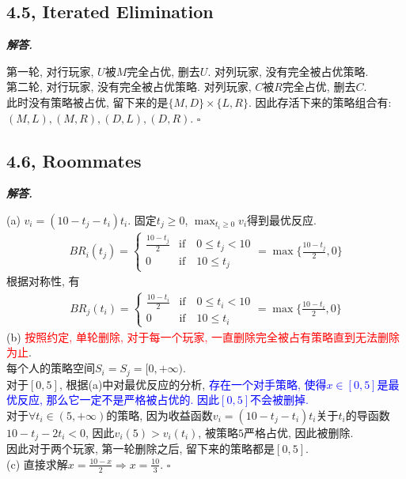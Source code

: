 \documentclass[10pt, a4paper, oneside]{ctexart}
\newenvironment{solution}{%
  \par\noindent\textbf{\textit{解答. }}\ignorespaces
}{%
  \hfill\ensuremath{\square}\par %
}
\begin{document}
\subsection{4.5, Iterated Elimination}

\begin{solution}
第一轮, 对行玩家, $U$被$M$完全占优, 删去$U$. 对列玩家, 没有完全被占优策略.\\
第二轮, 对行玩家, 没有完全被占优策略. 对列玩家, $C$被$R$完全占优, 删去$C$.\\
此时没有策略被占优, 留下来的是$\{M,D\}\times\{L,R\}$. 因此存活下来的策略组合有: $(M,L),(M,R),(D,L),(D,R)$.
\end{solution}


\subsection{4.6, Roommates}

\begin{solution}
(a) $v_i=(10-t_j-t_i)t_i$. 固定$t_j\geq 0$, $\max_{t_i\geq 0}v_i$得到最优反应.
\begin{align*}
    BR_i(t_j)=\begin{cases}
        \frac{10-t_j}{2}&\text{if}\quad 0\leq t_j<10 \\
        0 &\text{if}\quad 10\leq t_j
    \end{cases}=\max\{\frac{10-t_j}{2},0\}
\end{align*}
根据对称性, 有
\begin{align*}
    BR_j(t_i)=\begin{cases}
        \frac{10-t_i}{2}&\text{if}\quad 0\leq t_i<10 \\
        0 &\text{if}\quad 10\leq t_i
    \end{cases}=\max\{\frac{10-t_i}{2},0\}
\end{align*}
(b) \textcolor{red}{按照约定, 单轮删除, 对于每一个玩家, 一直删除完全被占有策略直到无法删除为止}.\\
每个人的策略空间$S_i=S_j=[0,+\infty)$.\\
对于$[0,5]$, 根据(a)中对最优反应的分析, \textcolor{blue}{存在一个对手策略, 使得$x\in [0,5]$是最优反应, 那么它一定不是严格被占优的. 因此$[0,5]$不会被删掉.}\\
对于$\forall t_i\in(5,+\infty)$的策略, 因为收益函数$v_i=(10-t_j-t_i)t_i$关于$t_i$的导函数$10-t_j-2t_i<0$, 因此$v_i(5)>v_i(t_i)$, 被策略$5$严格占优, 因此被删除.\\
因此对于两个玩家, 第一轮删除之后, 留下来的策略都是$[0,5]$.\\
(c) 直接求解$x=\frac{10-x}{2}\Rightarrow x=\frac{10}{3}$.
\end{solution}
\end{document}
